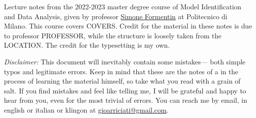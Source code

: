 Lecture notes from the 2022-2023 master degree course of Model Identification
and Data Analysis, given by professor \href{https://formentin.faculty.polimi.it/}{Simone Formentin} at Politecnico di Milano.
This course covers COVERS. Credit for the material in these notes is due to professor
PROFESSOR, while the structure is loosely taken from the LOCATION. The credit
for the typesetting is my own.

\textit{Disclaimer:} This document will inevitably contain some mistakes— both
simple typos and legitimate errors. Keep in mind that these are the notes of a
in the process of learning the material himself, so take what you read with a grain of salt.
If you find mistakes and feel like telling me, I will be grateful and happy to hear from you,
even for the most trivial of errors. You can reach me by email, in english or italian or klingon at
\href{mailto:gioarriciati@gmail.com}{gioarriciati@gmail.com}.
